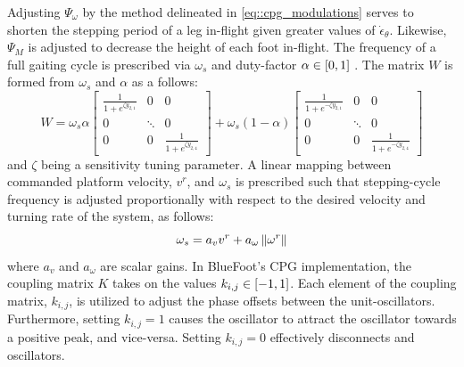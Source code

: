 			Adjusting $\Psi_{\omega}$ by the method delineated in \ref{eq::cpg_modulations} serves to shorten the stepping period of a leg in-flight given greater values of $\dot{\epsilon}_{\theta}$. Likewise, $\Psi_{M}$ is adjusted to decrease the height of each foot in-flight. The frequency of a full gaiting cycle is prescribed via $\omega_{s}$ and duty-factor $\alpha \in \left[0,1\right]$ \cite{Matos2010}. The matrix $W$ is formed from  $\omega_{s}$ and $\alpha$ as a follows:
				\newcommand{\Wel}[1]{\frac{1}{1+e^{#1}}}
				\begin{equation}
						W = 
						\omega_{s}\alpha 
						\left[	
							\begin{array}{ccc}
								\Wel{\zeta y_{2,1}} 		& 0 			& 0  \\
								0 							& \ddots 		& 0  \\
								0							& 0		 		& \Wel{\zeta y_{2,4}}
							\end{array}
						\right] + 
						\omega_{s}(1-\alpha) 
						\left[	
							\begin{array}{cccc}
								\Wel{-\zeta y_{2,1}} 		& 0 			& 0  \\
								0 							& \ddots 		& 0  \\
								0							& 0		 		& \Wel{-\zeta y_{2,4}}
							\end{array}
						\right]
					\label{eq::cpg_W_matrix_def}
				\end{equation}
			and $\zeta$ being a sensitivity tuning parameter. A linear mapping between commanded platform velocity, $v^{r}$, and $\omega_{s}$ is prescribed such that stepping-cycle frequency is adjusted proportionally with respect to the desired velocity and turning rate of the system, as follows:
				\begin{equation}
					\omega_{s} = a_{v}v^{r} + a_{\omega}\left\lVert\omega^{r}\right\rVert
				\end{equation}
			where $a_{v}$ and $a_{\omega}$ are scalar gains. In BlueFoot's CPG implementation, the coupling matrix $K$ takes on the values $k_{i,j} \in \left[-1,1\right]$. Each element of the coupling matrix, $k_{i,j}$, is utilized to adjust the phase offsets between the unit-oscillators. Furthermore, setting $k_{i,j}=1$ causes the \Jth oscillator to attract the \Ith oscillator  towards a  positive peak, and vice-versa. Setting $k_{i,j}=0$ effectively disconnects \Ith and \Jth oscillators. 


